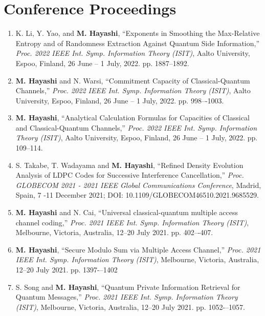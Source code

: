 \documentclass[a4paper,12pt,oneside]{article}
\begin{document}
\section{Conference Proceedings}
\begin{enumerate}
    \item
    K. Li, Y. Yao, and \textbf{M. Hayashi}, 
    ``Exponents in Smoothing the Max-Relative Entropy and of Randomness Extraction Against Quantum Side Information,''
    {\em Proc. 2022 IEEE Int. Symp. Information Theory (ISIT)}, 
    Aalto University, Espoo, Finland, 26 June – 1 July, 2022. pp. 1887--1892.
    
    \item
    \textbf{M. Hayashi} and N. Warsi, 
    ``Commitment Capacity of Classical-Quantum Channels,''
    {\em Proc. 2022 IEEE Int. Symp. Information Theory (ISIT)}, 
    Aalto University, Espoo, Finland, 26 June – 1 July, 2022. pp. 998–-1003.

    \item
    \textbf{M. Hayashi}, 
    ``Analytical Calculation Formulas for Capacities of Classical and Classical-Quantum Channels,''
    {\em Proc. 2022 IEEE Int. Symp. Information Theory (ISIT)}, 
    Aalto University, Espoo, Finland, 26 June – 1 July, 2022. pp. 109--114.

    \item
    S. Takabe, T. Wadayama and \textbf{M. Hayashi}, 
    ``Refined Density Evolution Analysis of LDPC Codes for Successive Interference Cancellation,''
    {\em Proc. GLOBECOM 2021 - 2021 IEEE Global Communications Conference}, 
    Madrid, Spain, 7 -11 December 2021; DOI: 10.1109/GLOBECOM46510.2021.9685529.

    \item
    \textbf{M. Hayashi} and N. Cai, 
    ``Universal classical-quantum multiple access channel
    coding,''
    {\em Proc. 2021 IEEE Int. Symp. Information Theory (ISIT)}, 
    Melbourne, Victoria, Australia, 12–20 July 2021. pp. 402–-407.
    
    \item
    \textbf{M. Hayashi}, 
    ``Secure Modulo Sum via Multiple Access Channel,''
    {\em Proc. 2021 IEEE Int. Symp. Information Theory (ISIT)}, 
    Melbourne, Victoria, Australia, 12–20 July 2021. pp. 1397-–1402
    
    \item
    S. Song and \textbf{M. Hayashi}, 
    ``Quantum Private Information Retrieval for Quantum Messages,''
    {\em Proc. 2021 IEEE Int. Symp. Information Theory (ISIT)}, 
    Melbourne, Victoria, Australia, 12–20 July 2021. pp. 1052-–1057.
    

\end{enumerate}
\end{document}
